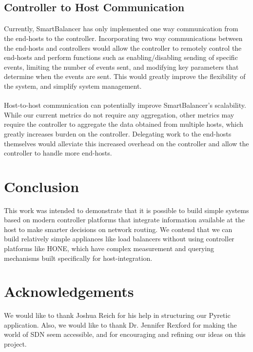 \documentclass[10pt]{article}
\begin{document}
\subsection{Controller to Host Communication}

\paragraph{} Currently, SmartBalancer has only implemented one way communication from the end-hosts to the controller. Incorporating two way communications between the end-hosts and controllers would allow the controller to remotely control the end-hosts and perform functions such as enabling/disabling sending of specific events, limiting the number of events sent, and modifying key parameters that determine when the events are sent. This would greatly improve the flexibility of the system, and simplify system management.

\paragraph{} Host-to-host communication can potentially improve SmartBalancer’s scalability. While our current metrics do not require any aggregation, other metrics may require the controller to aggregate the data obtained from multiple hosts, which greatly increases burden on the controller. Delegating work to the end-hosts themselves would alleviate this increased overhead on the controller and allow the controller to handle more end-hosts.

\section{Conclusion}
\label{sec:conclusion}

\paragraph{} This work was intended to demonstrate that it is possible to build simple systems based on modern controller platforms that integrate information available at the host to make smarter decisions on network routing. We contend that we can build relatively simple appliances like load balancers without using controller platforms like HONE, which have complex measurement and querying mechanisms built specifically for host-integration.

\section{Acknowledgements}

\paragraph{} We would like to thank Joshua Reich for his help in structuring our Pyretic application. Also, we would like to thank Dr. Jennifer Rexford for making the world of SDN seem accessible, and for encouraging and refining our ideas on this project.

{}

\end{document}
